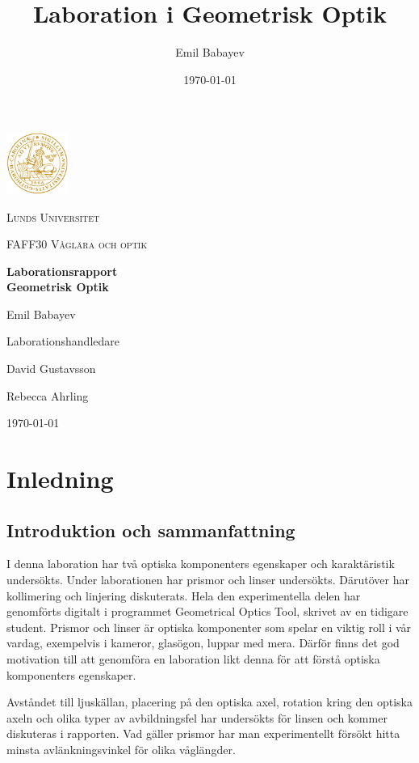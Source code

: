 \documentclass[a4paper]{article}
\title{Laboration i Geometrisk Optik}
\author{Emil Babayev}
\date{\today}
\begin{document}
\begin{titlepage}
	\centering
	\includegraphics[width=0.15\textwidth]{logo.png}\par\vspace{1cm}
	{\scshape\large Lunds Universitet \par}
	\vspace{1cm}
    {\scshape\large FAFF30 Våglära och optik\par}
	\vspace{1.5cm}
	{\huge\bfseries Laborationsrapport\\Geometrisk Optik\par}
	\vspace{2cm}
	{\Large Emil Babayev\par}
	\vfill
	Laborationshandledare\par
    David Gustavsson \par
    Rebecca Ahrling

    \vfill
    
	{\large \today \par}
\end{titlepage}

\section{Inledning}
\subsection{Introduktion och sammanfattning}
I denna laboration har två optiska komponenters egenskaper och karaktäristik undersökts. Under laborationen har prismor
och linser undersökts. Därutöver har kollimering och linjering diskuterats. Hela den experimentella delen har genomförts
digitalt i programmet Geometrical Optics Tool, skrivet av en tidigare student. Prismor och linser är optiska komponenter
som spelar en viktig roll i vår vardag, exempelvis i kameror, glasögon, luppar med mera. Därför finns det god motivation 
till att genomföra en laboration likt denna för att förstå optiska komponenters egenskaper.

Avståndet till ljuskällan, placering på den optiska axel, rotation kring den optiska axeln och olika typer av avbildningsfel
har undersökts för linsen och kommer diskuteras i rapporten. Vad gäller prismor har man experimentellt försökt hitta minsta avlänkningsvinkel
för olika våglängder.
\end{document}
